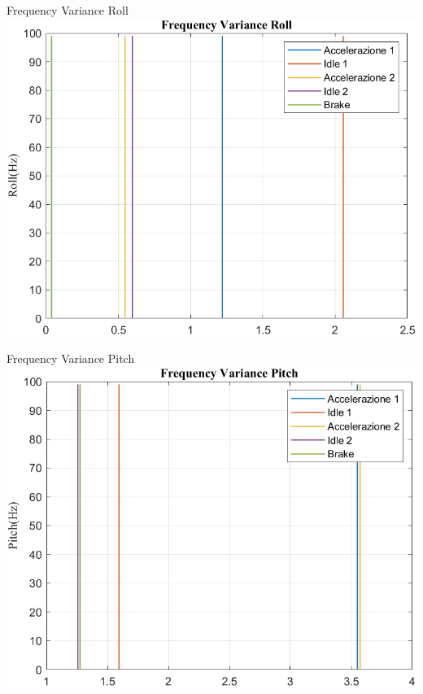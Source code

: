 \documentclass[beamer]{standalone}
\begin{document}
	\begin{frame}{{Frequency Variance Roll}}
		\centering\includegraphics[height=.8\textheight]{figure/VAng/Trasformata/Frequency VarianceRoll}
	\end{frame}
	
	\begin{frame}{{Frequency Variance Pitch}}
		\centering\includegraphics[height=.8\textheight]{figure/VAng/Trasformata/Frequency VariancePitch}
	\end{frame}
	
\end{document}
